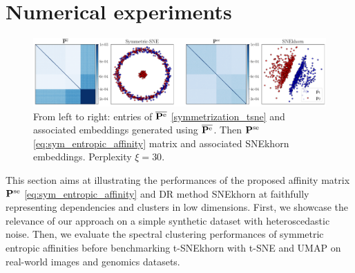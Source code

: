 \section{Numerical experiments}\label{sec:DR_experiments}


\begin{figure}
    \centering
    \includegraphics[width=\linewidth]{figures/SNEkhorn/heteroscedastic_noise.pdf}    \caption{From left to right: entries of $\overline{\mathbf{P}^{\mathrm{e}}}$ \eqref{symmetrization_tsne} and associated embeddings generated using $\overline{\mathbf{P}^{\mathrm{e}}}$. Then $\mathbf{P}^{\mathrm{se}}$ \eqref{eq:sym_entropic_affinity} matrix and associated SNEkhorn embeddings. Perplexity $\xi = 30$.}
    \label{fig:simulated_data_multinomial}
\end{figure}

This section aims at illustrating the performances of the proposed affinity
matrix $\mathbf{P}^{\mathrm{se}}$ \eqref{eq:sym_entropic_affinity} and DR method SNEkhorn at faithfully representing dependencies and
clusters in low dimensions. First, we showcase the relevance of our approach on a simple synthetic dataset with heteroscedastic noise. 
Then, we evaluate the spectral clustering
performances of symmetric entropic affinities before benchmarking
t-SNEkhorn with t-SNE and UMAP \cite{mcinnes2018umap} on real-world images and genomics datasets.

